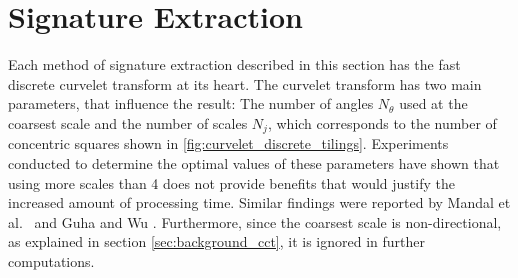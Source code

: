 \section{Signature Extraction}\label{sec:solution_signature_extraction}

Each method of signature extraction described in this section has the fast
discrete curvelet transform at its heart. The curvelet transform has two main
parameters, that influence the result: The number of angles $N_{\theta}$ used
at the coarsest scale and the number of scales $N_j$, which corresponds to the
number of concentric squares shown in \ref{fig:curvelet_discrete_tilings}.
Experiments conducted to determine the optimal values of these parameters have
shown that using more scales than 4 does not provide benefits that would
justify the increased amount of processing time. Similar findings were reported
by Mandal et al.\ \autocite{mandal_curvelet_2009} and Guha and Wu
\autocite{guha_curvelet_????}. Furthermore, since the coarsest scale is
non-directional, as explained in section \ref{sec:background_cct}, it is
ignored in further computations.

